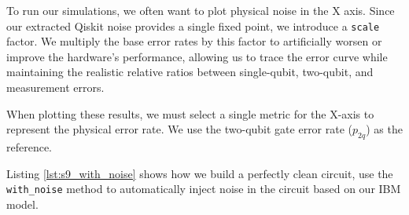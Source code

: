 To run our simulations, we often want to plot physical noise in the X axis. Since our extracted Qiskit noise provides a single fixed point, we introduce a \texttt{scale} factor. We multiply the base error rates by this factor to artificially worsen or improve the hardware's performance, allowing us to trace the error curve while maintaining the realistic relative ratios between single-qubit, two-qubit, and measurement errors.

When plotting these results, we must select a single metric for the X-axis to represent the physical error rate. We use the two-qubit gate error rate ($p_{2q}$) as the reference.

Listing \ref{lst:s9_with_noise} shows how we build a perfectly clean circuit, use the \texttt{with\_noise} method to automatically inject noise in the circuit based on our IBM model.

